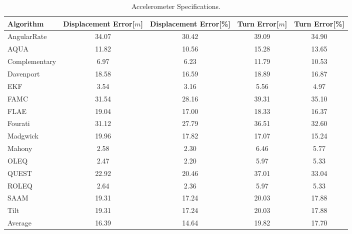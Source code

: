 \begin{table}[H]
    \begin{center}
        \begin{tabular}[t]{lcccc}
            \hline
            Algorithm                   & Displacement Error[$m$] & Displacement Error[\%]      & Turn Error[$m$]  & Turn Error[\%]             \\
            \hline 
            AngularRate            & 34.07  & 30.42 & 39.09 & 34.90              \\            AQUA            & 11.82  & 10.56 & 15.28 & 13.65              \\            Complementary            & 6.97  & 6.23 & 11.79 & 10.53              \\            Davenport            & 18.58  & 16.59 & 18.89 & 16.87              \\            EKF            & 3.54  & 3.16 & 5.56 & 4.97              \\            FAMC            & 31.54  & 28.16 & 39.31 & 35.10              \\            FLAE            & 19.04  & 17.00 & 18.33 & 16.37              \\            Fourati            & 31.12  & 27.79 & 36.51 & 32.60              \\            Madgwick            & 19.96  & 17.82 & 17.07 & 15.24              \\            Mahony            & 2.58  & 2.30 & 6.46 & 5.77              \\            OLEQ            & 2.47  & 2.20 & 5.97 & 5.33              \\            QUEST            & 22.92  & 20.46 & 37.01 & 33.04              \\            ROLEQ            & 2.64  & 2.36 & 5.97 & 5.33              \\            SAAM            & 19.31  & 17.24 & 20.03 & 17.88              \\            Tilt            & 19.31  & 17.24 & 20.03 & 17.88              \\
            \hline
            Average & 16.39 & 14.64 & 19.82 & 17.70
        \end{tabular}
        \caption{Accelerometer Specifications. }
        \label{tab:accelerometer_specification}
    \end{center}
\end{table}